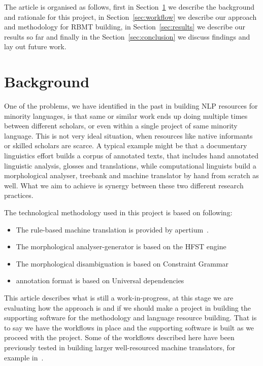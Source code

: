 \documentclass{flammie}
\begin{document}
The article is organised as follows, first in Section~\ref{sec:background} we
describe the background and rationale for this project, in
Section~\ref{sec:workflow} we describe our approach and methodology for RBMT
building, in Section~\ref{sec:results} we describe our results so far and
finally in the Section~\ref{sec:conclusion} we discuss findings and lay out
future work.

\section{Background}
\label{sec:background}

One of the problems, we have identified in the past in building NLP resources
for minority languages, is that same or similar work ends up doing multiple
times between different scholars, or even within a single project of same
minority language. This is not very ideal situation, when resources like native
informants or skilled scholars are scarce. A typical example might be that a
documentary linguistics effort builds a corpus of annotated texts, that
includes hand annotated linguistic analysis, glosses and translations, while
computational linguists build a morphological analyser, treebank and machine
translator by hand from scratch as well. What we aim to achieve is synergy
between these two different research practices.

The technological methodology used in this project is based on following:
\begin{itemize}
    \item The rule-based machine translation is provided by
        apertium~\cite{apertium}.
    \item The morphological analyser-generator is based on the HFST
        engine~\cite{linden2009hfst}
    \item The morphological disambiguation is based on Constraint
        Grammar~\cite{karlsson1990constraint}
    \item annotation format is based on Universal dependencies~\cite{ud24}
\end{itemize}

This article describes what is still a work-in-progress, at this stage we are
evaluating how the approach is and if we should make a project in building the
supporting software for the methodology and language resource building. That is
to say we have the workflows in place and the supporting software is built as we
proceed with the project.
Some of the workflows described here have been previously tested in building
larger well-resourced machine translators, for example in~\cite{pirinen2018rulebased}.
\end{document}
